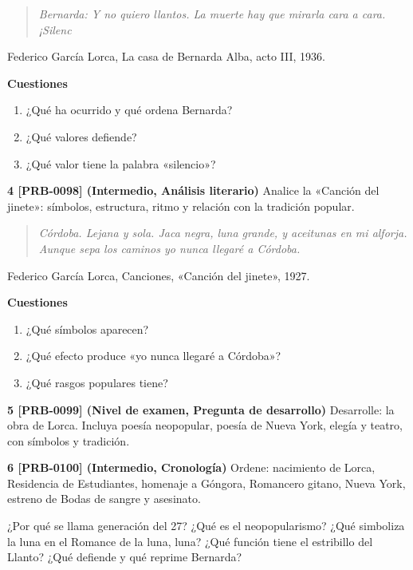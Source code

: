 \documentclass{book}
\begin{document}
\begin{tcolorbox}[title={Ejercicios}, studiumworked, breakable]
\begin{quote}
\itshape Bernarda: Y no quiero llantos. La muerte hay que mirarla cara a cara. ¡Silenc
\end{quote}
{\noindent\footnotesize Federico García Lorca, La casa de Bernarda Alba, acto III, 1936.\par}

\noindent\textbf{Cuestiones}
\begin{enumerate}
\item ¿Qué ha ocurrido y qué ordena Bernarda?
\item ¿Qué valores defiende?
\item ¿Qué valor tiene la palabra «silencio»?
\end{enumerate}

\noindent\textbf{4 [PRB-0098] (Intermedio, Análisis literario)}
Analice la «Canción del jinete»: símbolos, estructura, ritmo y relación con la tradición popular.


\begin{quote}
\itshape Córdoba. Lejana y sola. Jaca negra, luna grande, y aceitunas en mi alforja. Aunque sepa los caminos yo nunca llegaré a Córdoba.
\end{quote}
{\noindent\footnotesize Federico García Lorca, Canciones, «Canción del jinete», 1927.\par}

\noindent\textbf{Cuestiones}
\begin{enumerate}
\item ¿Qué símbolos aparecen?
\item ¿Qué efecto produce «yo nunca llegaré a Córdoba»?
\item ¿Qué rasgos populares tiene?
\end{enumerate}

\noindent\textbf{5 [PRB-0099] (Nivel de examen, Pregunta de desarrollo)}
Desarrolle: la obra de Lorca. Incluya poesía neopopular, poesía de Nueva York, elegía y teatro, con símbolos y tradición.


\noindent\textbf{6 [PRB-0100] (Intermedio, Cronología)}
Ordene: nacimiento de Lorca, Residencia de Estudiantes, homenaje a Góngora, Romancero gitano, Nueva York, estreno de Bodas de sangre y asesinato.

\end{tcolorbox}

\begin{tcolorbox}[title={Autoficha}, studiumcheck, breakable]

¿Por qué se llama generación del 27? ¿Qué es el neopopularismo? ¿Qué simboliza la luna en el Romance de la luna, luna? ¿Qué función tiene el estribillo del Llanto? ¿Qué defiende y qué reprime Bernarda?

\end{tcolorbox}
\end{document}
